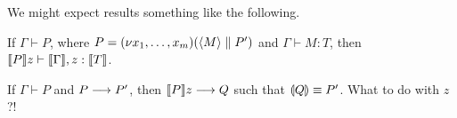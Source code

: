 \documentclass[orivec,envcountsame]{llncs}
\begin{document}
We might expect results something like the following.

\begin{theorem}
  If $\Gamma \vdash P$, where $P = (\nu x_1,\dots,x_m)(\langle M \rangle \parallel P')$ and $\Gamma
  \vdash M: T$, then $\llbracket P \rrbracket z \vdash \llbracket \Gamma \rrbracket, z:\llbracket T \rrbracket$.
\end{theorem}

\begin{theorem}
  If $\Gamma \vdash P$ and $P \longrightarrow P'$, then $\llbracket P \rrbracket z \longrightarrow Q$ such that $\llparenthesis Q \rrparenthesis
  \equiv P'$.  What to do with $z$?!
\end{theorem}
\end{document}
